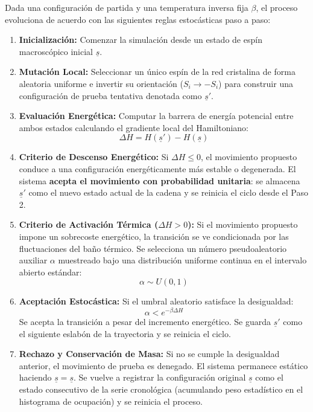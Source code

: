 \documentclass[10pt]{book}
\begin{document}
\begin{teo}
Dada una configuración de partida y una temperatura inversa fija $\beta$, el proceso evoluciona de acuerdo con las siguientes reglas estocásticas paso a paso:
\begin{enumerate}
    \item[\textbf{\color{red}1)}] \textbf{Inicialización:} Comenzar la simulación desde un estado de espín macroscópico inicial $\underline{s}$.
    
    \item[\textbf{\color{red}2)}] \textbf{Mutación Local:} Seleccionar un único espín de la red cristalina de forma aleatoria uniforme e invertir su orientación ($S_i \to -S_i$) para construir una configuración de prueba tentativa denotada como $\underline{s}'$.
    
    \item[\textbf{\color{red}3)}] \textbf{Evaluación Energética:} Computar la barrera de energía potencial entre ambos estados calculando el gradiente local del Hamiltoniano:
    \[
    \Delta H = H(\underline{s}') - H(\underline{s})
    \]
    
    \item[\textbf{\color{red}4)}] \textbf{Criterio de Descenso Energético:} Si $\Delta H \le 0$, el movimiento propuesto conduce a una configuración energéticamente más estable o degenerada. El sistema \textbf{acepta el movimiento con probabilidad unitaria}: se almacena $\underline{s}'$ como el nuevo estado actual de la cadena y se reinicia el ciclo desde el Paso 2.
    
    \item[\textbf{\color{red}5)}] \textbf{Criterio de Activación Térmica ($\Delta H > 0$):} Si el movimiento propuesto impone un sobrecoste energético, la transición se ve condicionada por las fluctuaciones del baño térmico. Se selecciona un número pseudoaleatorio auxiliar $\alpha$ muestreado bajo una distribución uniforme continua en el intervalo abierto estándar:
    \[
    \alpha \sim U(0,1)
    \]
    
    \item[\textbf{\color{red}6)}] \textbf{Aceptación Estocástica:} Si el umbral aleatorio satisface la desigualdad:
    \[
    \alpha < e^{-\beta \Delta H}
    \]
    Se acepta la transición a pesar del incremento energético. Se guarda $\underline{s}'$ como el siguiente eslabón de la trayectoria y se reinicia el ciclo.
    
    \item[\textbf{\color{red}7)}] \textbf{Rechazo y Conservación de Masa:} Si no se cumple la desigualdad anterior, el movimiento de prueba es denegado. El sistema permanece estático haciendo $\underline{s} = \underline{s}$. Se vuelve a registrar la configuración original $\underline{s}$ como el estado consecutivo de la serie cronológica (acumulando peso estadístico en el histograma de ocupación) y se reinicia el proceso.
\end{enumerate}
\end{teo}
\end{document}
